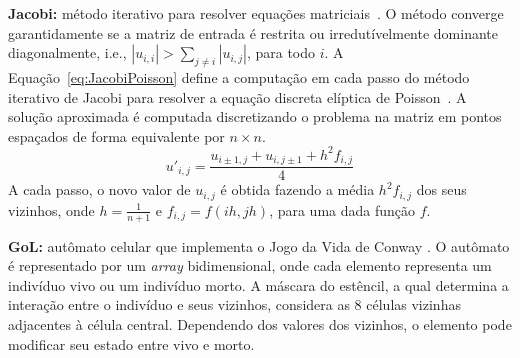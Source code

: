 \textbf{Jacobi:} método iterativo para resolver equações matriciais~\cite{demmel97}.
O método converge garantidamente se a matriz de entrada é restrita ou irredutívelmente dominante diagonalmente, i.e., $|u_{i,i}| > \sum_{j\neq i}{|u_{i,j}|}$, para todo $i$.
A Equação~\ref{eq:JacobiPoisson} define a computação em cada passo do método iterativo de Jacobi para resolver a equação discreta elíptica de Poisson~\cite{demmel97}. A solução aproximada é computada discretizando o problema na matriz em pontos espaçados de forma equivalente por $n\times n$.\\
 \begin{equation}
 u'_{i,j} = \frac{u_{i\pm1,j} + u_{i,j\pm1} + h^2f_{i,j}}{4}
 \label{eq:JacobiPoisson}
 \end{equation}
 A cada passo, o novo valor de $u_{i,j}$ é obtida fazendo a média $h^2f_{i,j}$ dos seus vizinhos, onde $h = \frac{1}{n+1}$ e $f_{i,j} = f(ih,jh)$,
 para uma dada função $f$.

\textbf{GoL:} autômato celular que implementa o Jogo da Vida de Conway \cite{gardner70}. O autômato é representado por um \textit{array} bidimensional, onde cada elemento representa um indivíduo vivo ou um indivíduo morto. A máscara do estêncil, a qual determina a interação entre o indivíduo e seus vizinhos, considera as $8$ células vizinhas adjacentes à célula central. Dependendo dos valores dos vizinhos, o elemento pode modificar seu estado entre vivo e morto.\\

